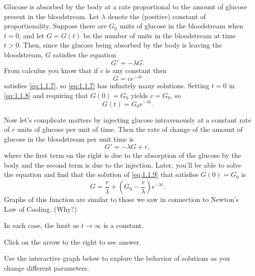 \documentclass{ximera}
\begin{document}
Glucose is absorbed by
the body at a rate proportional to the amount of glucose present in
the bloodstream. Let $\lambda$ denote the (positive) constant of
proportionality. Suppose   there are $G_0$ units of glucose in
the bloodstream when $t=0$, and let $G=G(t)$ be the number of units in
the bloodstream at time $t>0$. Then, since the glucose being absorbed
by the body is leaving the bloodstream, $G$ satisfies the equation
\begin{equation} \label{eq:1.1.7}
G'=-\lambda G.
\end{equation}
From  calculus you know that if $c$ is any constant then
\begin{equation} \label{eq:1.1.8}
G=ce^{-\lambda t}
\end{equation}
satisfies \eqref{eq:1.1.7}, so \eqref{eq:1.1.7} has infinitely
many solutions.
 Setting $t=0$ in \eqref{eq:1.1.8} and requiring that
$G(0)=G_0$ yields $c=G_0$, so
$$
G(t)=G_0e^{-\lambda t}.
$$
 
Now let's complicate matters by injecting glucose intravenously
at a constant rate of $r$ units of glucose per unit of time.
Then the rate of change of the amount of glucose  in the bloodstream
per unit time is
\begin{equation} \label{eq:1.1.9}
G'=-\lambda G+r,
\end{equation}
where the first term on the right is due to the absorption of the
glucose by the body and the second term is due to the injection.
 Later,
you'll be able to solve the equation and find %
that the solution
of
\eqref{eq:1.1.9} that satisfies $G(0)=G_0$ is
$$
G=\frac{r}{\lambda}+\left(G_0-\frac{r}{\lambda}\right)e^{-\lambda t}.
$$
Graphs of  this function are similar to those we saw in connection to Newton's Law of Cooling.
(Why?)
 
 \begin{solution}
 In each case, the limit as $t \rightarrow \infty$ is a constant.
 \end{solution}
 
  Click on the arrow to the right to see answer.
 
 Use the interactive graph below to explore the behavior of solutions as you change different parameters.
 
\begin{center}  
\end{center}
 
 
\end{document}
